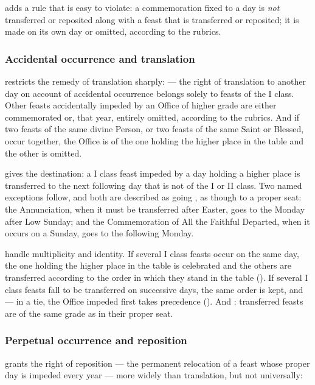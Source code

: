  adds a rule that is easy to violate: a commemoration fixed to a day is \emph{not}
transferred or reposited along with a feast that is transferred or reposited; it is made on its
own day or omitted, according to the rubrics.

\subsubsection{Accidental occurrence and translation}

 restricts the remedy of translation sharply:  — the right of translation
to another day on account of accidental occurrence belongs solely to feasts of the I class.
Other feasts accidentally impeded by an Office of higher grade are either commemorated or, that
year, entirely omitted, according to the rubrics. And if two feasts of the same divine Person, or
two feasts of the same Saint or Blessed, occur together, the Office is of the one holding the
higher place in the table and the other is omitted.

 gives the destination: a I class feast impeded by a day holding a higher place is
transferred to the next following day that is not of the I or II class. Two named exceptions
follow, and both are described as going , as though to a proper
seat: the Annunciation, when it must be transferred after Easter, goes to the Monday after Low
Sunday; and the Commemoration of All the Faithful Departed, when it occurs on a Sunday, goes to
the following Monday.

 handle multiplicity and identity. If several I class feasts occur on the same day,
the one holding the higher place in the table is celebrated and the others are transferred
according to the order in which they stand in the table (). If several I class feasts fall
to be transferred on successive days, the same order is kept, and  — in a tie, the Office impeded first takes precedence
(). And : transferred feasts are of the same grade as in their proper seat.

\subsubsection{Perpetual occurrence and reposition}

 grants the right of reposition — the permanent relocation of a feast whose proper day
is impeded every year — more widely than translation, but not universally:

